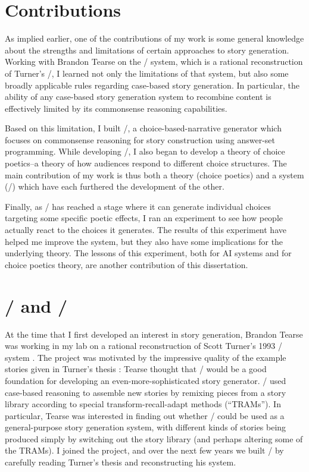 \section{Contributions}

As implied earlier, one of the contributions of my work is some general knowledge about the strengths and limitations of certain approaches to story generation.
%
Working with Brandon Tearse on the \skald/ system, which is a rational reconstruction of Turner's \minstrel/, I learned not only the limitations of that system, but also some broadly applicable rules regarding case-based story generation.
%
In particular, the ability of any case-based story generation system to recombine content is effectively limited by its commonsense reasoning capabilities.


Based on this limitation, I built \dunyazad/, a choice-based-narrative generator which focuses on commonsense reasoning for story construction using answer-set programming.
%
While developing \dunyazad/, I also began to develop a theory of choice poetics--a theory of how audiences respond to different choice structures.
%
The main contribution of my work is thus both a theory (choice poetics) and a system (\dunyazad/) which have each furthered the development of the other.


Finally, as \dunyazad/ has reached a stage where it can generate individual choices targeting some specific poetic effects, I ran an experiment to see how people actually react to the choices it generates.
%
The results of this experiment have helped me improve the system, but they also have some implications for the underlying theory.
%
The lessons of this experiment, both for AI systems and for choice poetics theory, are another contribution of this dissertation.



\section{\minstrel/ and \skald/}

At the time that I first developed an interest in story generation, Brandon Tearse was working in my lab on a rational reconstruction of Scott Turner's 1993 \minstrel/ system \cite{Turner1993}.
%
The project was motivated by the impressive quality of the example stories given in Turner's thesis \cite{Turner1993}: Tearse thought that \minstrel/ would be a good foundation for developing an even-more-sophisticated story generator.
%
\minstrel/ used case-based reasoning to assemble new stories by remixing pieces from a story library according to special transform-recall-adapt methods (``TRAMs'').
%
In particular, Tearse was interested in finding out whether \minstrel/ could be used as a general-purpose story generation system, with different kinds of stories being produced simply by switching out the story library (and perhaps altering some of the TRAMs).
%
I joined the project, and over the next few years we built \skald/ by carefully reading Turner's thesis and reconstructing his system.



